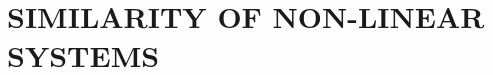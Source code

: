 \chapter{SIMILARITY OF NON-LINEAR SYSTEMS}
\label{chap:similary_of_nonlinear_systems}
\thispagestyle{empty}



